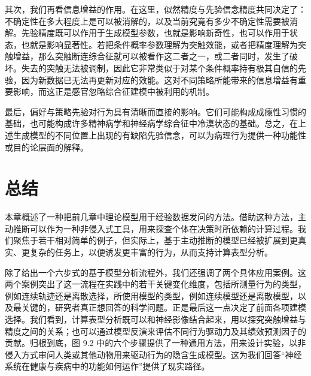 其次，我们再看信息增益的作用。在这里，似然精度与先验信念精度共同决定了：不确定性在多大程度上是可以被消解的，以及当前究竟有多少不确定性需要被消解。先验精度既可以作用于生成模型参数，也就是影响新奇性，也可以作用于状态，也就是影响显著性。若把条件概率参数理解为突触效能，或者把精度理解为突触增益，那么突触断连综合征就可以被看作这二者之一，或二者同时，发生了破坏。失去的突触无法被调制，因此它非常类似于对某个条件概率持有极其自信的先验，因为新数据已无法再更新对应的效能。这对不同策略所能带来的信息增益有重要影响，而这正是感官忽略综合征建模中被利用的机制。

最后，偏好与策略先验对行为具有清晰而直接的影响。它们可能构成成瘾性习惯的基础，也可能构成许多精神病学和神经病学综合征中冷漠状态的基础。总之，在上述生成模型的不同位置上出现的有缺陷先验信念，可以为病理行为提供一种功能性或目的论层面的解释。

\section{总结}

本章概述了一种把前几章中理论模型用于经验数据发问的方法。借助这种方法，主动推断可以作为一种非侵入式工具，用来探查个体在决策时所依赖的计算过程。我们聚焦于若干相对简单的例子，但实际上，基于主动推断的模型已经被扩展到更真实、更复杂的任务上，以便诱发更丰富的行为，从而支持计算表型分析。

除了给出一个六步式的基于模型分析流程外，我们还强调了两个具体应用案例。这两个案例突出了这一流程在实践中的若干关键变化维度，包括所测量行为的类型，例如连续轨迹还是离散选择，所使用模型的类型，例如连续模型还是离散模型，以及最关键的，研究者真正想回答的科学问题。正是最后这一点决定了前面各项建模选择。我们看到，计算表型分析既可以和神经影像结合起来，用以探究突触增益与精度之间的关系；也可以通过模型反演来评估不同行为驱动力及其绩效预测因子的贡献。归根到底，图 9.2 中的六个步骤提供了一种通用方法，用来设计实验，以非侵入方式审问人类或其他动物用来驱动行为的隐含生成模型。这为我们回答“神经系统在健康与疾病中的功能如何运作”提供了现实路径。
